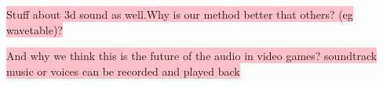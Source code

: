 \colorbox{pink}{Stuff about 3d sound as well.Why is our method better that others? (eg wavetable)?}

\colorbox{pink}{ And why we think this is the future of the audio in video games? soundtrack music or voices can be recorded and played back}


  



